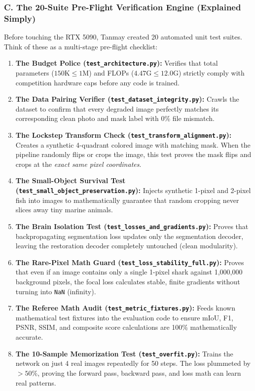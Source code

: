 \documentclass[10pt,a4paper]{article}
\begin{document}
\subsubsection{C. The 20-Suite Pre-Flight Verification Engine (Explained Simply)}
Before touching the RTX 5090, Tanmay created 20 automated unit test suites. Think of these as a multi-stage pre-flight checklist:
\begin{enumerate}[noitemsep,topsep=1pt,leftmargin=1.4em]
    \item \textbf{The Budget Police (\texttt{test\_architecture.py}):} Verifies that total parameters ($150\text{K} \le 1\text{M}$) and FLOPs ($4.47\text{G} \le 12.0\text{G}$) strictly comply with competition hardware caps before any code is trained.
    \item \textbf{The Data Pairing Verifier (\texttt{test\_dataset\_integrity.py}):} Crawls the dataset to confirm that every degraded image perfectly matches its corresponding clean photo and mask label with 0\% file mismatch.
    \item \textbf{The Lockstep Transform Check (\texttt{test\_transform\_alignment.py}):} Creates a synthetic 4-quadrant colored image with matching mask. When the pipeline randomly flips or crops the image, this test proves the mask flips and crops at the \textit{exact same pixel coordinates}.
    \item \textbf{The Small-Object Survival Test (\texttt{test\_small\_object\_preservation.py}):} Injects synthetic 1-pixel and 2-pixel fish into images to mathematically guarantee that random cropping never slices away tiny marine animals.
    \item \textbf{The Brain Isolation Test (\texttt{test\_losses\_and\_gradients.py}):} Proves that backpropagating segmentation loss updates only the segmentation decoder, leaving the restoration decoder completely untouched (clean modularity).
    \item \textbf{The Rare-Pixel Math Guard (\texttt{test\_loss\_stability\_full.py}):} Proves that even if an image contains only a single 1-pixel shark against 1,000,000 background pixels, the focal loss calculates stable, finite gradients without turning into \texttt{NaN} (infinity).
    \item \textbf{The Referee Math Audit (\texttt{test\_metric\_fixtures.py}):} Feeds known mathematical test fixtures into the evaluation code to ensure mIoU, F1, PSNR, SSIM, and composite score calculations are 100\% mathematically accurate.
    \item \textbf{The 10-Sample Memorization Test (\texttt{test\_overfit.py}):} Trains the network on just 4 real images repeatedly for 50 steps. The loss plummeted by $>50\%$, proving the forward pass, backward pass, and loss math can learn real patterns.

\end{enumerate}
\end{document}
